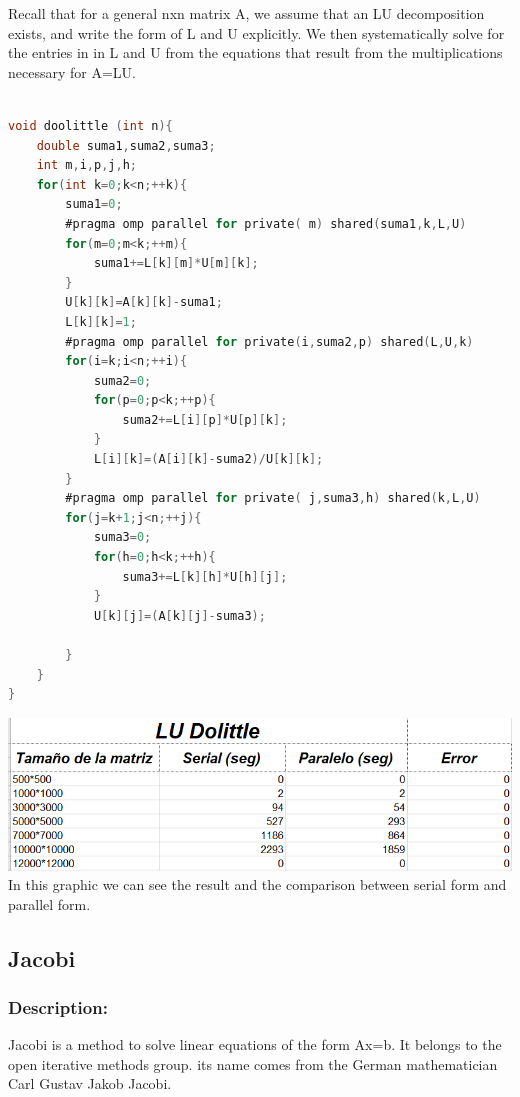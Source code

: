 \documentclass{article}
\newcounter{subsubsubsection}[subsubsection]
\begin{document}
Recall that for a general nxn matrix A, we assume that an LU decomposition exists, and write the form of L and U explicitly. We then systematically solve for the entries in in L and U from the equations that result from the multiplications necessary for A=LU.


\begin{lstlisting}[language=C]

void doolittle (int n){
    double suma1,suma2,suma3;
    int m,i,p,j,h;
    for(int k=0;k<n;++k){
        suma1=0;
        #pragma omp parallel for private( m) shared(suma1,k,L,U)
        for(m=0;m<k;++m){
            suma1+=L[k][m]*U[m][k];
        }
        U[k][k]=A[k][k]-suma1;
        L[k][k]=1;
        #pragma omp parallel for private(i,suma2,p) shared(L,U,k)
        for(i=k;i<n;++i){
            suma2=0;
            for(p=0;p<k;++p){
                suma2+=L[i][p]*U[p][k];
            }
            L[i][k]=(A[i][k]-suma2)/U[k][k];
        }
        #pragma omp parallel for private( j,suma3,h) shared(k,L,U)
        for(j=k+1;j<n;++j){
            suma3=0;
            for(h=0;h<k;++h){
                suma3+=L[k][h]*U[h][j];
            }
            U[k][j]=(A[k][j]-suma3);
         
        }
    }
}

\end{lstlisting}





\includegraphics[width=\linewidth]{./images/dolittle.PNG}\\
In this graphic we can see the result and the comparison between serial form and parallel form.

\newpage

\subsection{Jacobi}

\subsubsection{Description:}
Jacobi is a method to solve linear equations of the form Ax=b. It belongs to the open iterative methods group. its name comes from the German mathematician Carl Gustav Jakob Jacobi.\\
\end{document}
